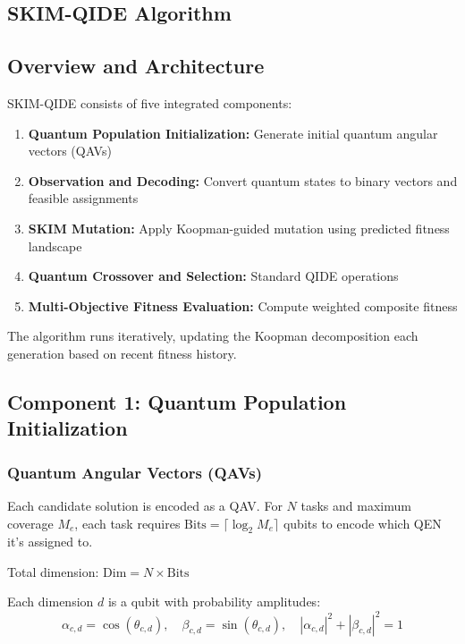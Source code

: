 \documentclass[12pt,a4paper]{article}
\begin{document}
\subsection{SKIM-QIDE Algorithm}

\subsection{Overview and Architecture}

SKIM-QIDE consists of five integrated components:

\begin{enumerate}
  \item \textbf{Quantum Population Initialization:} Generate initial quantum angular vectors (QAVs)
  \item \textbf{Observation and Decoding:} Convert quantum states to binary vectors and feasible assignments
  \item \textbf{SKIM Mutation:} Apply Koopman-guided mutation using predicted fitness landscape
  \item \textbf{Quantum Crossover and Selection:} Standard QIDE operations
  \item \textbf{Multi-Objective Fitness Evaluation:} Compute weighted composite fitness
\end{enumerate}

The algorithm runs iteratively, updating the Koopman decomposition each generation based on recent fitness history.

\subsection{Component 1: Quantum Population Initialization}

\subsubsection{Quantum Angular Vectors (QAVs)}

Each candidate solution is encoded as a QAV. For $N$ tasks and maximum coverage $M_e$, each task requires $\mathrm{Bits} = \lceil \log_2 M_e \rceil$ qubits to encode which QEN it's assigned to.

Total dimension: $\mathrm{Dim} = N \times \mathrm{Bits}$

Each dimension $d$ is a qubit with probability amplitudes:
\begin{equation}
\alpha_{c,d} = \cos(\theta_{c,d}), \quad \beta_{c,d} = \sin(\theta_{c,d}), \quad |\alpha_{c,d}|^2 + |\beta_{c,d}|^2 = 1
\end{equation}
\end{document}
